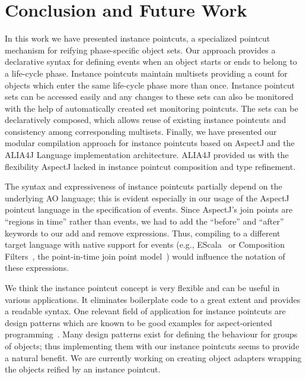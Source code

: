 \documentclass{acm_proc_article-sp}
\begin{document}
\section{Conclusion and Future Work}
In this work we have presented instance pointcuts, a specialized pointcut mechanism for reifying phase-specific object sets. Our approach provides a declarative syntax for defining events when an object starts or ends to belong to a life-cycle phase. Instance pointcuts maintain multisets providing a count for objects which enter the same life-cycle phase more than once. Instance pointcut sets can be accessed easily and any changes to these sets can also be monitored with the help of automatically created set monitoring pointcuts. The sets can be declaratively composed, which allows reuse of existing instance pointcuts and consistency among corresponding multisets. Finally, we have presented our modular compilation approach for instance pointcuts based on AspectJ and the ALIA4J Language implementation architecture. ALIA4J provided us with the flexibility AspectJ lacked in instance pointcut composition and type refinement.

The syntax and expressiveness of instance pointcuts partially depend on the underlying AO language; this is evident especially in our usage of the AspectJ pointcut language in the specification of events. Since AspectJ's join points are ``regions in time'' rather than events, we had to add the ``before'' and ``after'' keywords to our add and remove expressions. Thus, compiling to a different target language with native support for events (e.g., EScala~\cite{Gasiunas2011} or Composition Filters~\cite{Bergmans2001b}, the point-in-time join point model~\cite{masuharafine}) would influence the notation of these expressions.

We think the instance pointcut concept is very flexible and can be useful in various applications. It eliminates boilerplate code to a great extent and provides a readable syntax. One relevant field of application for instance pointcuts are design patterns which are known to be good examples for aspect-oriented programming~\cite{hannemann:oopsla02}. Many design patterns exist for defining the behaviour for groups of objects; thus implementing them with our instance pointcuts seems to provide a natural benefit. We are currently working on creating object adapters wrapping the objects reified by an instance pointcut.




\end{document}
